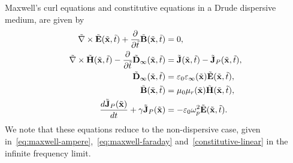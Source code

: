Maxwell's curl equations and constitutive equations in a Drude dispersive medium,
are given by
\begin{subequations}
  \label{eq:dispersive-maxwell-system}
  \begin{align}
    \tilde{\nabla} \times \tilde{\mathbf{E}}(\tilde{\mathbf{x}},\tilde{t}) + \frac{\partial}{\partial \tilde{t} }  \tilde{\mathbf{B}}(\tilde{\mathbf{x}}, \tilde{t})&= 0, \\
    \tilde{\nabla} \times \tilde{\mathbf{H}}(\tilde{\mathbf{x}},\tilde{t}) - \frac{\partial}{\partial \tilde{t} }  \tilde{\mathbf{D}}_{\infty}(\tilde{\mathbf{x}}, \tilde{t})&= \tilde{\mathbf{J}}(\tilde{\mathbf{x}},\tilde{t}) - \tilde{\mathbf{J}}_P(\tilde{\mathbf{x}},\tilde{t}), \\
    \tilde{\mathbf{D}}_{\infty}(\tilde{\mathbf{x}},\tilde{t}) &= \varepsilon_0 \varepsilon_{\infty}(\tilde{\mathbf{x}}) \tilde{\mathbf{E}}(\tilde{\mathbf{x}},\tilde{t}), \\
    \tilde{\mathbf{B}}(\tilde{\mathbf{x}},\tilde{t}) &= \mu_0 \mu_r(\tilde{\mathbf{x}}) \tilde{\mathbf{H}}(\tilde{\mathbf{x}},\tilde{t}), \\
    \frac{d \tilde{\mathbf{J}}_P(\tilde{\mathbf{x}})}{dt} + \gamma \tilde{\mathbf{J}}_P(\tilde{\mathbf{x}}) &= - \varepsilon_0 \omega_p^2 \tilde{\mathbf{E}}(\tilde{\mathbf{x}}, \tilde{t}) . \label{eq:maxwell-dispersive-ADE}
  \end{align}
\end{subequations}
We note that these equations reduce to the non-dispersive case, given
in~\eqref{eq:maxwell-ampere},~\eqref{eq:maxwell-faraday} and~\eqref{constitutive-linear} 
in the infinite frequency limit.

